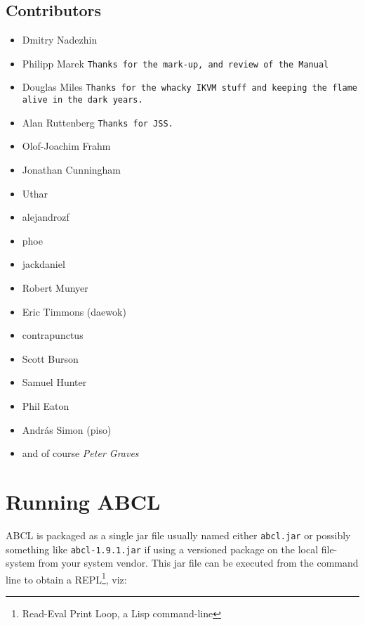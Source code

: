 \documentclass[10pt]{book}
\begin{document}
\section{Contributors}

\begin{itemize}
\item Dmitry Nadezhin
\item Philipp Marek \texttt{Thanks for the mark-up, and review of the Manual}
\item Douglas Miles \texttt{Thanks for the whacky IKVM stuff and keeping the flame alive
  in the dark years.}
\item Alan Ruttenberg \texttt{Thanks for JSS.}
\item Olof-Joachim Frahm
\item Jonathan Cunningham
\item Uthar
\item alejandrozf
\item phoe
\item jackdaniel
\item Robert Munyer
\item Eric Timmons (daewok)
\item contrapunctus
\item Scott Burson
\item Samuel Hunter
\item Phil Eaton

  
\item Andr\'as Simon (piso)
\item and of course \emph{Peter Graves}
\end{itemize}


\chapter{Running ABCL}


\textsc{ABCL} is packaged as a single jar file usually named either
\texttt{abcl.jar} or possibly something like \texttt{abcl-1.9.1.jar} if
using a versioned package on the local file-system from your system
vendor.  This jar file can be executed from the command line to obtain a
\textsc{REPL}\footnote{Read-Eval Print Loop, a Lisp command-line}, viz:


\end{document}
